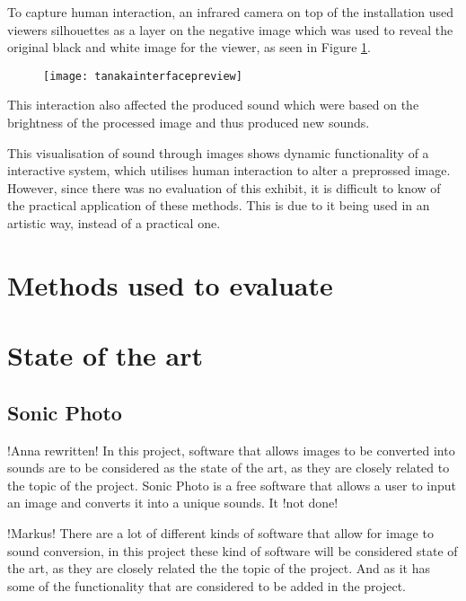To capture human interaction, an infrared camera on top of the installation used viewers silhouettes as a layer on the negative image which was used to reveal the original black and white image for the viewer, as seen in Figure \ref{fig:tanakainterfacepreview}.

\begin{figure}[!h]
\centering
\texttt{[image: tanakainterfacepreview]}
\caption{\label{fig:tanakainterfacepreview}\cite{Tanaka2012}}
\end{figure}

This interaction also affected the produced sound which were based on the brightness of the processed image and thus produced new sounds. 

This visualisation of sound through images shows dynamic functionality of a interactive system, which utilises human interaction to alter a preprossed image. However, since there was no evaluation of this exhibit, it is difficult to know of the practical application of these methods. This is due to it being used in an artistic way, instead of a practical one.   

\section{Methods used to evaluate}\label{sub:methodsusedtoevaluate}


\section{State of the art}\label{sec:stateart}

\subsection{Sonic Photo}\label{sub:sonic}
!Anna rewritten!
In this project, software that allows images to be converted into sounds are to be considered as the state of the art, as they are closely related to the topic of the project. 
Sonic Photo \cite{White2013} is a free software that allows a user to input an image and converts it into a unique sounds. It !not done!




!Markus!
There are a lot of different kinds of software that allow for image to sound conversion, in this project these kind of software will be considered state of the art, as they are closely related the the topic of the project. And as it has some of the functionality that are considered to be added in the project.


